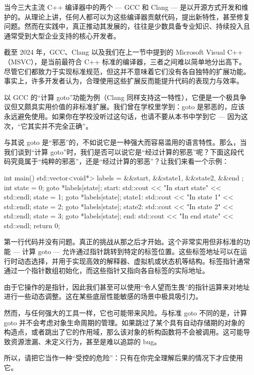 
当今三大主流 C++ 编译器中的两个 --- GCC 和 Clang --- 是以开源方式开发和维护的。从理论上讲，任何人都可以为这些编译器贡献代码，提出新特性，甚至修复问题。然而在实践中，真正推动其发展的，往往是少数具备专业知识、持续投入且通常受到大型企业支持的核心开发者。

截至 2024 年，GCC、Clang 以及我们在上一节中提到的 Microsoft Visual C++（MSVC），是当前最符合 C++ 标准的编译器，三者之间难以简单地分出高下。尽管它们都致力于实现标准规范，但这并不意味着它们没有各自独特的扩展功能。事实上，许多开发者认为，合理使用这些扩展反而能提升代码的表现力与效率。

以 GCC 的“计算 goto”功能为例（Clang 同样支持这一特性），它便是一个极具争议但又颇具实用价值的非标准扩展。我们曾在学校里学到：goto 是邪恶的，应该永远避免使用。如果你在学校没听过这句话，也请不要从本书中学到它 --- 因为这次，“它其实并不完全正确”。

与其说 goto 是“邪恶”的，不如说它是一种强大而容易滥用的语言特性。那么，当我们谈到“计算 goto”时，我们是否可以说它是“经过计算的邪恶”呢？下面这段代码究竟属于“纯粹的邪恶”，还是“经过计算的邪恶”？让我们来看一个示例：

\begin{cpp}
int main() {
  std::vector<void*> labels = { &&start, &&state1, &&state2, &&end };
  int state = 0;
  goto *labels[state];
  start:
    std::cout << "In start state" << std::endl;
    state = 1;
    goto *labels[state];
  state1:
    std::cout << "In state 1" << std::endl;
    state = 2;
    goto *labels[state];
  state2:
    std::cout << "In state 2" << std::endl;
    state = 3;
    goto *labels[state];
  end:
    std::cout << "In end state" << std::endl;
    return 0;
}
\end{cpp}

第一行代码并没有问题。真正的挑战从那之后才开始。这个非常实用但非标准的功能 --- 计算 goto --- 允许通过指针跳转到特定的标签位置。这些标签地址可以在运行时动态选择，并用于实现高效的解释器、虚拟机或状态机等结构。标签指针通常通过一个指针数组初始化，而这些指针又指向各自标签的实际地址。

由于它操作的是指针，因此我们甚至可以使用“令人望而生畏”的指针运算来对地址进行一些动态调整。这在某些底层性能敏感的场景中极具吸引力。

然而，与任何强大的工具一样，它也可能带来风险。与标准 goto 不同的是，计算 goto 并不会考虑对象生命周期的管理。如果跳过了某个具有自动存储期的对象的构造点，或者跳出了它的作用域，那么该对象的析构函数将不会被调用。这可能导致资源泄漏、未定义行为，甚至是难以追踪的 bug。

所以，请把它当作一种“受控的危险”：只有在你完全理解后果的情况下才应使用它。


